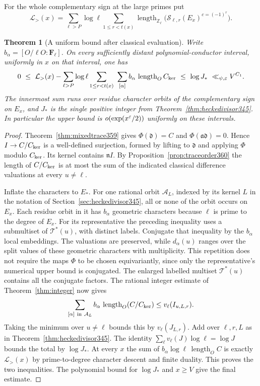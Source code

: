 \documentclass[a4paper,11pt]{article}
\newtheorem{theorem}[proposition]{Theorem}
\theoremstyle{definition}
\theoremstyle{remark}
\newcommand{\ZZ}{\mathbb Z}\newcommand{\ord}{\operatorname{ord}}
\newcommand{\len}{\operatorname{length}}\newcommand{\Res}{\operatorname*{Res}}
\numberwithin{equation}{section}
\begin{document}
For the whole complementary sign
at the large primes put
\[
 \mathcal L_{>}(x)=
 \sum_{\ell>P}\log\ell\sum_{1\le r<t(x)}
    \len_{\ZZ_\ell}\bigl(\mathcal S_{\ell,r}(E_x)^{c=(-1)^r}\bigr).
\]

\begin{theorem}[A uniform bound after classical evaluation]
\label{thm:classicaldefect360}
Write \(b_\alpha=[O/\ell O:\mathbf F_\ell]\). On every
sufficiently distant polynomial-conductor interval, uniformly in
\(x\) on that interval, one has
\[
 0\ \le\ \mathcal L_{>}(x)-
 \sum_{\ell>P}\log\ell\sum_{1\le r<t(x)}\ \sum_{[\alpha]}
       b_\alpha\,\len_O C_{\rm ker}
 \ \le\ \log J_* \ \ll_{\psi,\eps} V^{C_1}.
\]
The innermost sum runs over residue character orbits of the
complementary sign on \(E_x\), and \(J_*\) is the single positive
integer from Theorem~\ref{thm:heckedivisor345}. In particular the
upper bound is \(o(\exp(x^\varepsilon/2))\) uniformly on these intervals.
\end{theorem}
\begin{proof}
Theorem~\ref{thm:mixedtrace359} gives \(\Phi(\mathfrak d)=C\)
and \(\Phi(\mathfrak a\mathfrak d)=0\). Hence \(I\to C/C_{\rm ker}\)
is a well-defined surjection, formed by lifting to \(\mathfrak d\)
and applying \(\Phi\) modulo \(C_{\rm ker}\). Its kernel contains
\(\mathfrak nI\). By Proposition~\ref{prop:traceorder360} the
length of \(C/C_{\rm ker}\) is at most the sum of the indicated
classical difference valuations at every \(u\ne\ell\).

Inflate the characters to \(E_*\). For one rational orbit
\(\mathcal A_L\), indexed by its kernel \(L\) in the notation
of Section~\ref{sec:heckedivisor345}, all or none of the orbit
occurs on \(E_x\). Each residue orbit in it has \(b_\alpha\)
geometric characters because \(\ell\) is prime to the degree
of \(E_x\). For its representative the preceding inequality
uses a submultiset of \(\mathcal T^*(u)\), with distinct labels.
Conjugate that inequality by the \(b_\alpha\) local embeddings.
The valuations are preserved, while \(d_\alpha(u)\) ranges over
the split values of these geometric characters with multiplicity.
This repetition does not require the maps \(\Phi\) to be chosen
equivariantly, since only the representative's numerical upper
bound is conjugated. The enlarged labelled multiset
\(\mathcal T^*(u)\) contains all the conjugate factors.
The rational integer estimate of Theorem~\ref{thm:integer} now
gives
\[
 \sum_{[\alpha]\ \mathrm{in}\ \mathcal A_L}
           b_\alpha\,\len_O(C/C_{\rm ker})
      \le v_\ell(I_{u,L,r}).
\]
Taking the minimum over \(u\ne\ell\) bounds this by
\(v_\ell(J_{L,r})\). Add over \(\ell,r,L\) as in
Theorem~\ref{thm:heckedivisor345}. The identity
\(\sum_\ell v_\ell(J)\log\ell=\log J\) bounds the total by
\(\log J_*\). At every \(x\) the sum of
\(b_\alpha\log\ell\,\len_O C\) is exactly \(\mathcal L_{>}(x)\)
by prime-to-degree character descent and finite duality. This
proves the two inequalities. The polynomial bound for
\(\log J_*\) and \(x\ge V\) give the final estimate.
\end{proof}
\end{document}
